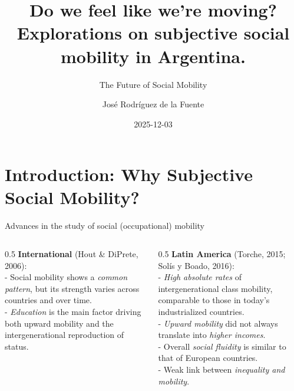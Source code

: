 \documentclass[
  ignorenonframetext,
  aspectratio=169,
]{beamer}
\title{Do we feel like we're moving? Explorations on subjective social
mobility in Argentina.}
\subtitle{The Future of Social Mobility}
\author{José Rodríguez de la Fuente}
\date{2025-12-03}
\begin{document}
\frame{\titlepage}


\section{Introduction: Why Subjective Social
Mobility?}\label{introduction-why-subjective-social-mobility}

\begin{frame}{Advances in the study of social (occupational) mobility}
\label{advances-in-the-study-of-social-occupational-mobility}
\begin{columns}[T]
\begin{column}{0.5\linewidth}
\textbf{International} (Hout \& DiPrete, 2006):\\
- Social mobility shows a \emph{common pattern}, but its strength varies
across countries and over time.\\
- \emph{Education} is the main factor driving both upward mobility and
the intergenerational reproduction of status.
\end{column}

\begin{column}{0.5\linewidth}
\textbf{Latin America} (Torche, 2015; Solís y Boado, 2016):\\
- \emph{High absolute rates} of intergenerational class mobility,
comparable to those in today's industrialized countries.\\
- \emph{Upward mobility} did not always translate into \emph{higher
incomes}.\\
- Overall \emph{social fluidity} is similar to that of European
countries.\\
- Weak link between \emph{inequality and mobility}.
\end{column}
\end{columns}
\end{frame}
\end{document}
